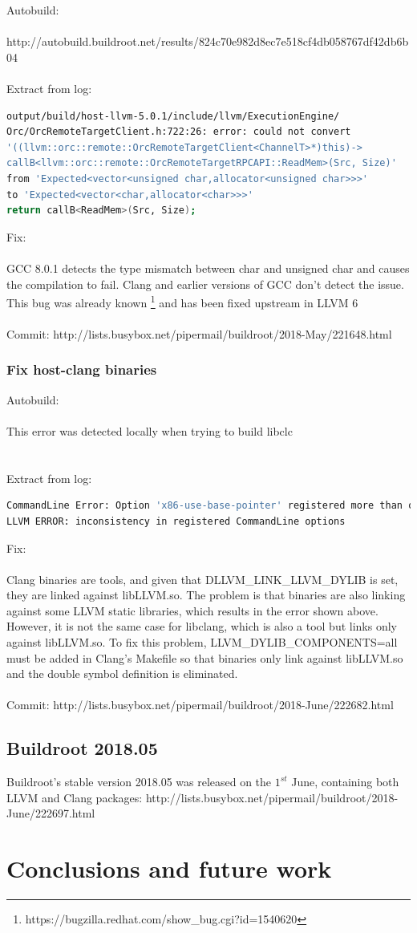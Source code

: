 \documentclass[12pt,a4paper,oneside]{article}
\begin{document}
Autobuild:\\\\
http://autobuild.buildroot.net/results/824c70e982d8ec7e518cf4db058767df42db6b04\\\\
Extract from log:
\begin{lstlisting}[language=sh,keywords={}]
output/build/host-llvm-5.0.1/include/llvm/ExecutionEngine/
Orc/OrcRemoteTargetClient.h:722:26: error: could not convert
'((llvm::orc::remote::OrcRemoteTargetClient<ChannelT>*)this)->
callB<llvm::orc::remote::OrcRemoteTargetRPCAPI::ReadMem>(Src, Size)'
from 'Expected<vector<unsigned char,allocator<unsigned char>>>'
to 'Expected<vector<char,allocator<char>>>'
return callB<ReadMem>(Src, Size);
\end{lstlisting}
Fix:\\\\
GCC 8.0.1 detects the type mismatch between char and unsigned char and causes the
compilation to fail. Clang and earlier versions of GCC don't detect the issue.
This bug was already known
\footnote{https://bugzilla.redhat.com/show\_bug.cgi?id=1540620} and has been
fixed upstream in LLVM 6\\\\
Commit: http://lists.busybox.net/pipermail/buildroot/2018-May/221648.html
\subsubsection*{Fix host-clang binaries}
Autobuild:\\\\
This error was detected locally when trying to build libclc\\\\\\
Extract from log:
\begin{lstlisting}[language=sh,keywords={}]
CommandLine Error: Option 'x86-use-base-pointer' registered more than once!
LLVM ERROR: inconsistency in registered CommandLine options
\end{lstlisting}
Fix:\\\\
Clang binaries are tools, and given that DLLVM\_LINK\_LLVM\_DYLIB is set,
they are linked against libLLVM.so. The problem is that binaries are
also linking against some LLVM static libraries, which results in the error
shown above. However, it is not the same case for libclang, which is also
a tool but links only against libLLVM.so. To fix this problem,
LLVM\_DYLIB\_COMPONENTS=all must be added in Clang's Makefile so that binaries
only link against libLLVM.so and the double symbol definition is eliminated.
\\\\
Commit: http://lists.busybox.net/pipermail/buildroot/2018-June/222682.html

\subsection*{Buildroot 2018.05}

Buildroot's stable version 2018.05 was released on the $1^{st}$ June, containing
both LLVM and Clang packages:
http://lists.busybox.net/pipermail/buildroot/2018-June/222697.html

\newpage
\section{Conclusions and future work} \label{Conclusions and future work}
\end{document}

